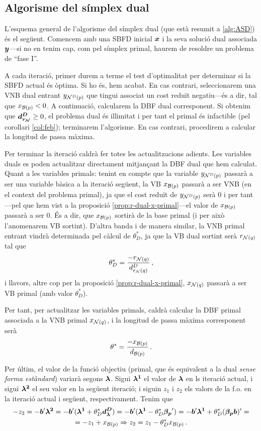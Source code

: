 \subsection{Algorisme del símplex dual}

L'esquema general de l'algorisme del símplex dual (que està resumit a 
\ref{alg:ASD}) és el 
següent. Comencem amb una SBFD inicial $\boldsymbol{x}$ i la seva solució dual 
associada $\boldsymbol{y}$---si no en tenim cap, com pel símplex primal, haurem de 
resoldre un problema de ``fase I''. 

A cada iteració, primer durem a terme el test d'optimalitat per determinar si 
la SBFD actual és òptima. Si ho és, hem acabat. En cas contrari, seleccionarem 
una VNB dual entrant ${y_{\mathcal{N}^D(p)}}$ que tingui associat un cost reduït 
negatiu---és a dir, tal que $x_{\mathcal{B}(p)} < 0$. A continuació, calcularem la DBF 
dual corresponent. Si obtenim que $\boldsymbol{d^D_{r_{\mathcal{N}}}} \ge 0$, el problema dual és 
il\lgem limitat i per tant el primal és infactible (pel corol\lgem lari 
\ref{col:feb}); 
terminarem l'algorisme. En cas contrari, procedirem a calcular la longitud de 
passa màxima.

Per terminar la iteració caldrà fer totes les actualitzacions adients. Les 
variables duals es poden actualitzar directament mitjançant la DBF dual que hem 
calculat. Quant a les variables primals: tenint 
en compte que la variable $y_{\mathcal{N}^D(p)}$ passarà a ser una variable 
bàsica a la iteració següent, la VB $x_{\mathcal{B}(p)}$ passarà a ser VNB (en el 
context del problema primal), ja que el 
cost reduït de $y_{\mathcal{N}^D(p)}$ serà 0 i per tant---pel que hem vist a la 
proposició \ref{prop:r-dual-x-primal}---el valor de $x_{\mathcal{B}(p)}$ passarà a ser 
0. És a dir, que $x_{\mathcal{B}(p)}$ sortirà de la base primal (i per això l'anomenarem 
VB sortint). D'altra banda i de manera similar, la VNB primal entrant vindrà
determinada pel càlcul 
de $\theta^\ast_D$, ja que la VB dual sortint serà $r_{\mathcal{N}(q)}$ tal que 
\[\theta_D^\ast = \frac{-r_{\mathcal{N}(q)}}{d^D_{r_{\mathcal{N}}(q)}}\,,\] i llavors, altre cop 
per 
la proposició \ref{prop:r-dual-x-primal}, $x_{\mathcal{N}(q)}$ passarà a ser VB primal 
(amb valor $\theta^\ast_D$).

Per tant, per actualitzar les variables primals, caldrà calcular la DBF primal 
associada a la VNB primal $x_{\mathcal{N}(q)}$, i la longitud de passa màxima 
corresponent serà
\[
	\theta^\ast = \frac{-x_{\mathcal{B}(p)}}{d_{\mathcal{B}(p)}}\,.
\] 

Per últim, el valor de la funció objectiu (primal, que és equivalent a la dual 
\textit{sense forma estàndard}) variarà segons $\boldsymbol{\lambda}$. 
Sigui $\boldsymbol{\lambda^1}$ el valor de $\boldsymbol{\lambda}$ en ls iteració actual, i 
sigui $\boldsymbol{\lambda^2}$ el seu valor en la següent iteració; i siguin $z_1$ i 
$z_2$ els valors de la f.o. en la iteració actual i següent, respectivament. 
Tenim que
\begin{multline*}
	-z_2 = -\boldsymbol{b}'\boldsymbol{\lambda^2} = -\boldsymbol{b}'(\boldsymbol{\lambda^1} + 
	\theta_D^*\boldsymbol{d^D_\lambda}) = -\boldsymbol{b}'(\boldsymbol{\lambda^1} - 
	\theta_D^*\boldsymbol{\beta_p}') = -\boldsymbol{b}'\boldsymbol{\lambda^1} + 
	\theta^*_D(\boldsymbol{\beta_p}\boldsymbol{b})' = \\
	= -z_1 + x_{\mathcal{B}(p)} \Rightarrow z_2 = z_1 - \theta_D^* x_{\mathcal{B}(p)}\,.
\end{multline*}

